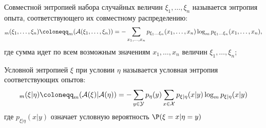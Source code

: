 \begin{definition}
	Совместной энтропией набора случайных величин $\xi_1, \ldots, \xi_n$ называется энтропия опыта, соответствующего их совместному распределению:
	\[
		\H_m(\xi_1, \ldots, \xi_n) \coloneqq \H_m(\mathcal{A}(\xi_1, \ldots, \xi_n)) = -\sum_{x_1,\ldots,x_n} p_{\xi_1\ldots\xi_n}(x_1,\ldots,x_n) \log_m p_{\xi_1\ldots\xi_n}(x_1,\ldots,x_n),
	\]
	где сумма идет по всем возможным значениям $x_1, \ldots, x_n$ величин $\xi_1, \ldots, \xi_n$;
\end{definition}

\begin{definition}
	Условной энтропией $\xi$ при условии $\eta$ называется условная энтропия соответствующих опытов:
	\[
		\H_m(\xi | \eta) \coloneqq \H_m(\mathcal{A}(\xi) | \mathcal{A}(\eta)) = -\sum_{y \in \mathcal{Y}} p_{\eta}(y) \sum_{x \in \mathcal{X}} p_{\xi | \eta}(x | y) \log_m p_{\xi | \eta}(x | y)
	\]
	где $p_{\xi | \eta}(x | y)$ означает условную вероятность $\P(\xi = x | \eta = y)$
\end{definition}

